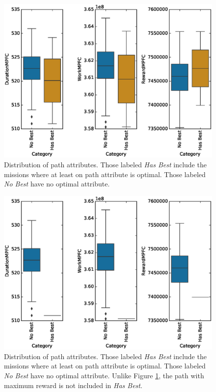 \documentclass{tamuccthesis}
\begin{document}
\begin{figure}[H]
    \captionsetup{justification=centering}
    \centering
    \includegraphics[width=\textwidth]{EXP4_MPFC_box_r.eps}
    \caption[Distribution of path attributes.]{Distribution of path attributes. Those labeled \textit{Has Best} include the missions where at least on path attribute is optimal. Those labeled \textit{No Best} have no optimal attribute.}
    \label{fig:MPFC_box_withreward}
\end{figure}

\begin{figure}[H]
    \captionsetup{justification=centering}
    \centering
    \includegraphics[width=\textwidth]{EXP4_MPFC_box_nr.eps}
    \caption[Distribution of path attributes, without reward in selecting best candidate solution.]{Distribution of path attributes. Those labeled \textit{Has Best} include the missions where at least on path attribute is optimal. Those labeled \textit{No Best} have no optimal attribute. Unlike Figure \ref{fig:MPFC_box_withreward}, the path with maximum reward is not included in \textit{Has Best}.}
    \label{fig:MPFC_box_noreward}
\end{figure}
\end{document}
